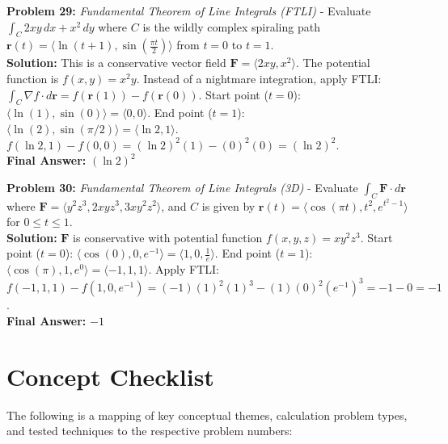 \documentclass[11pt]{article}
\begin{document}
\textbf{Problem 29:} \textit{Fundamental Theorem of Line Integrals (FTLI)} - Evaluate $\int_C 2xy \,dx + x^2 \,dy$ where $C$ is the wildly complex spiraling path $\mathbf{r}(t) = \langle \ln(t+1), \sin(\frac{\pi t}{2}) \rangle$ from $t=0$ to $t=1$.
\\
\textbf{Solution:} This is a conservative vector field $\mathbf{F} = \langle 2xy, x^2 \rangle$. The potential function is $f(x,y) = x^2y$.
Instead of a nightmare integration, apply FTLI: $\int_C \nabla f \cdot d\mathbf{r} = f(\mathbf{r}(1)) - f(\mathbf{r}(0))$.
Start point ($t=0$): $\langle \ln(1), \sin(0) \rangle = \langle 0, 0 \rangle$.
End point ($t=1$): $\langle \ln(2), \sin(\pi/2) \rangle = \langle \ln 2, 1 \rangle$.
$f(\ln 2, 1) - f(0,0) = (\ln 2)^2(1) - (0)^2(0) = (\ln 2)^2$.
\\
\textbf{Final Answer:} $(\ln 2)^2$
\vspace{0.5cm}

\textbf{Problem 30:} \textit{Fundamental Theorem of Line Integrals (3D)} - Evaluate $\int_C \mathbf{F} \cdot d\mathbf{r}$ where $\mathbf{F} = \langle y^2z^3, 2xyz^3, 3xy^2z^2 \rangle$, and $C$ is given by $\mathbf{r}(t) = \langle \cos(\pi t), t^2, e^{t^2-1} \rangle$ for $0 \le t \le 1$.
\\
\textbf{Solution:} $\mathbf{F}$ is conservative with potential function $f(x,y,z) = xy^2z^3$.
Start point ($t=0$): $\langle \cos(0), 0, e^{-1} \rangle = \langle 1, 0, \frac{1}{e} \rangle$.
End point ($t=1$): $\langle \cos(\pi), 1, e^0 \rangle = \langle -1, 1, 1 \rangle$.
Apply FTLI: $f(-1, 1, 1) - f(1, 0, e^{-1}) = (-1)(1)^2(1)^3 - (1)(0)^2(e^{-1})^3 = -1 - 0 = -1$.
\\
\textbf{Final Answer:} $-1$

\newpage
\section*{Concept Checklist}
The following is a mapping of key conceptual themes, calculation problem types, and tested techniques to the respective problem numbers:
\end{document}
